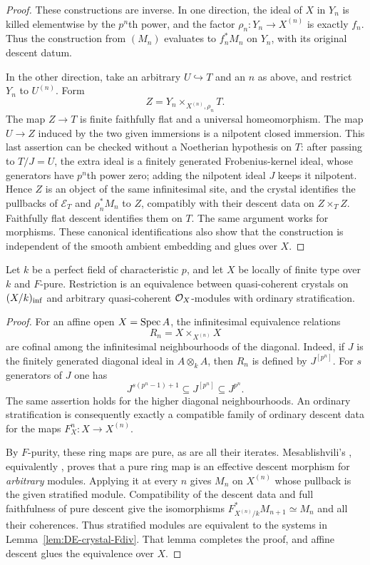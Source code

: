 \begin{proof}
These constructions are inverse.  In one direction, the ideal of $X$ in $Y_n$ is killed elementwise by the $p^n$th power, and the factor $\rho_n:Y_n\to X^{(n)}$ is exactly $f_n$.  Thus the construction from $(M_n)$ evaluates to $f_n^*M_n$ on $Y_n$, with its original descent datum.

In the other direction, take an arbitrary $U\hookrightarrow T$ and an $n$ as above, and restrict $Y_n$ to $U^{(n)}$.  Form
\[
       Z=Y_n\times_{X^{(n)},\rho_n}T.
\]
The map $Z\to T$ is finite faithfully flat and a universal homeomorphism.  The map $U\to Z$ induced by the two given immersions is a nilpotent closed immersion.  This last assertion can be checked without a Noetherian hypothesis on $T$: after passing to $T/J=U$, the extra ideal is a finitely generated Frobenius-kernel ideal, whose generators have $p^n$th power zero; adding the nilpotent ideal $J$ keeps it nilpotent.  Hence $Z$ is an object of the same infinitesimal site, and the crystal identifies the pullbacks of $\mathcal E_T$ and $\rho_n^*M_n$ to $Z$, compatibly with their descent data on $Z\times_T Z$.  Faithfully flat descent identifies them on $T$.  The same argument works for morphisms.  These canonical identifications also show that the construction is independent of the smooth ambient embedding and glues over $X$.
\end{proof}

\begin{proposition}\label{prop:DE-E2-Fpure}
Let $k$ be a perfect field of characteristic $p$, and let $X$ be locally of finite type over $k$ and $F$-pure.  Restriction is an equivalence between quasi-coherent crystals on $(X/k)_{\rm inf}$ and arbitrary quasi-coherent $\mathcal O_X$-modules with ordinary stratification.
\end{proposition}
\begin{proof}
For an affine open $X=\operatorname{Spec} A$, the infinitesimal equivalence relations
\[
       R_n=X\times_{X^{(n)}}X
\]
are cofinal among the infinitesimal neighbourhoods of the diagonal.  Indeed, if $J$ is the finitely generated diagonal ideal in $A\otimes_k A$, then $R_n$ is defined by $J^{[p^n]}$.  For $s$ generators of $J$ one has
\[
       J^{s(p^n-1)+1}\subseteq J^{[p^n]}\subseteq J^{p^n}.
\]
The same assertion holds for the higher diagonal neighbourhoods.  An ordinary stratification is consequently exactly a compatible family of ordinary descent data for the maps $F_X^n:X\to X^{(n)}$.

By $F$-purity, these ring maps are pure, as are all their iterates.  Mesablishvili's \cite[Theorem~4]{Mesablishvili2000}, equivalently \cite[Theorem~35.4.22, Tag~08WE]{StacksProject}, proves that a pure ring map is an effective descent morphism for \emph{arbitrary} modules.  Applying it at every $n$ gives $M_n$ on $X^{(n)}$ whose pullback is the given stratified module.  Compatibility of the descent data and full faithfulness of pure descent give the isomorphisms
$F_{X^{(n)}/k}^*M_{n+1}\simeq M_n$ and all their coherences.  Thus stratified modules are equivalent to the systems in Lemma~\ref{lem:DE-crystal-Fdiv}.  That lemma completes the proof, and affine descent glues the equivalence over $X$.
\end{proof}

